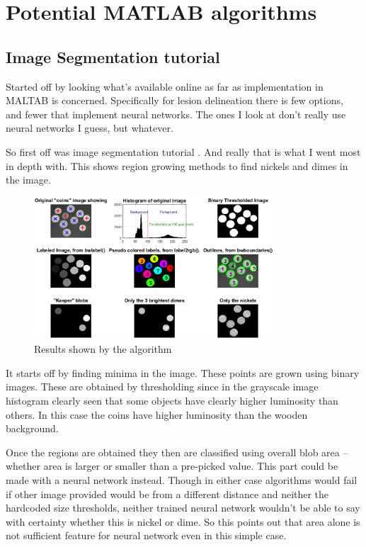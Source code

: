 \documentclass[12pt]{article}
\begin{document}
\section{Potential MATLAB algorithms}
\label{sec:poMaAl}

\subsection{Image Segmentation tutorial}
\label{ssec:imSegTut}

Started off by looking what's available online as far as implementation in MALTAB is concerned. Specifically for lesion delineation there is few options, and fewer that implement neural networks. The ones I look at don't really use neural networks I guess, but whatever. 

So first off was image segmentation tutorial \cite{matlabSegmentationTutorial}. And really that is what I went most in depth with. This shows region growing methods to find nickels and dimes in the image. 

\begin{figure}[!htb]
\centering
\includegraphics[width=0.8\textwidth]{img/coinsThresholdedSegmentation}
\caption{Results shown by the algorithm}
\label{fig:coinsThresholdedSegmentation}
\end{figure}

It starts off by finding minima in the image. These points are grown using binary images. These are obtained by thresholding since in the grayscale image histogram clearly seen that some objects have clearly higher luminosity than others. In this case the coins have higher luminosity than the wooden background.

Once the regions are obtained they then are classified using overall blob area – whether area is larger or smaller than a pre-picked value. This part could be made with a neural network instead. Though in either case algorithms would fail if other image provided would be from a different distance and neither the hardcoded size thresholds, neither trained neural network wouldn't be able to say with certainty whether this is nickel or dime. So this points out that area alone is not sufficient feature for neural network even in this simple case.
\end{document}
